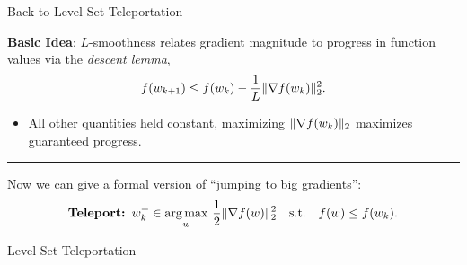 \documentclass[usenames,dvipsnames,mathserif,notheorems]{beamer}
\newcommand{\horizontalrule}{
	{
			\vspace{-0.5em}
			\center \rule{\textwidth}{0.1em}
			\vspace{-0.2em}
		}
}
\newcommand{\bad}[1]{\textcolor{bad}{#1}}
\newcommand{\good}[1]{\textcolor{good}{#1}}
\begin{document}
\begin{frame}{Back to Level Set Teleportation}

    \textbf{Basic Idea}: \( L \)-smoothness relates
    gradient magnitude to progress in function values via the
    \emph{descent lemma},
    \[
        f(w_{k+1}) \leq f(w_k) - \frac{1}{L}\|\nabla f(w_k)\|_2^2.
    \]
    \pause

    \begin{itemize}
        \item All other quantities \bad{held constant}, maximizing \(
              \|\nabla f(w_k)\|_2 \) maximizes \good{guaranteed progress}.
    \end{itemize}

    \pause
    \horizontalrule
    \vspace{2ex}

    Now we can give a formal version of ``jumping to big gradients'':
    \pause
    \[
        \textbf{Teleport: } w_k^+ \in \mathop{\rm arg\,max}_w \, \frac 1 2 \|\nabla f(w)\|^2_2  \quad \text{s.t.} \quad f(w) \leq f(w_k).
    \]

\end{frame}

\begin{frame}{}
    \begin{center}
        \huge Level Set Teleportation
    \end{center}
\end{frame}
\end{document}
